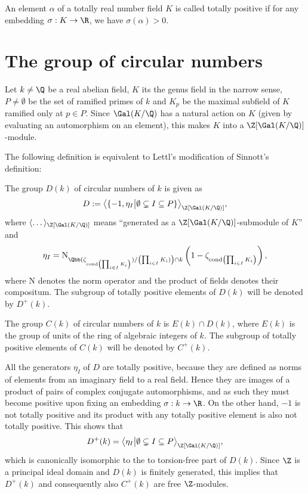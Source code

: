 \begin{definition}
An element $\alpha$ of a totally real number field $K$ is called totally positive if for any embedding $\sigma: K\to \R$, we have $\sigma(\alpha)>0$.
\end{definition}

\section{The group of circular numbers}
Let $k\neq \Q$ be a real abelian field, $K$ its the genus field in the narrow sense, $P\neq \emptyset$ be the set of ramified primes of $k$ and $K_p$ be the maximal subfield of $K$ ramified only at $p\in P$. Since $\Gal(K/\Q)$ has a natural action on $K$ (given by evaluating an automorphism on an element), this makes $K$ into a $\Z[\Gal(K/\Q)]$-module. 

The following definition is equivalent to Lettl's modification of Sinnott's definition:
\begin{definition}
The group $D(k)$ of circular numbers of $k$ is given as
$$D:=\big\langle \{-1, \eta_I \big\vert \emptyset \subsetneq I \subseteq P \}\big\rangle_{\Z[\Gal(K/\Q)]},$$
where $\langle \dots \rangle_{\Z[\Gal(K/\Q)]}$ means \enquote{generated as a $\Z[\Gal(K/\Q)]$-submodule of $K$} and $$\eta_I=\text{N}_{\Qbb(\zeta_{\text{cond} \left(\prod_{i\in I}K_i\right)})/\left(\prod_{i\in I}K_i)\right)\cap k}\left(1-\zeta_{\text{cond} \left(\prod_{i\in I}K_i\right)}\right),$$ where $\text{N}$ denotes the norm operator and the product of fields denotes their compositum. The subgroup of totally positive elements of $D(k)$ will be denoted by $D^+(k)$.
\end{definition}

\begin{definition}
The group $C(k)$ of circular numbers of $k$ is $E(k)\cap D(k)$, where $E(k)$ is the group of units of the ring of algebraic integers of $k$. The subgroup of totally positive elements of $C(k)$ will be denoted by $C^+(k)$.
\end{definition}

\begin{rem}
All the generators $\eta_I$ of $D$ are totally positive, because they are defined as norms of elements from an imaginary field to a real field. Hence they are images of a product of pairs of complex conjugate automorphisms, and as such they must become positive upon fixing an embedding $\sigma:k\to \R$. On the other hand, $-1$ is not totally positive and its product with any totally positive element is also not totally positive. This shows that $$D^+(k)=\big\langle  \eta_I \big\vert \emptyset \subsetneq I \subseteq P\big\rangle_{\Z[\Gal(K/\Q)]},$$
which is canonically isomorphic to the to torsion-free part of $D(k)$. Since $\Z$ is a principal ideal domain and $D(k)$ is finitely generated, this implies that $D^+(k)$ and consequently also $C^+(k)$ are free $\Z$-modules.
\end{rem}

